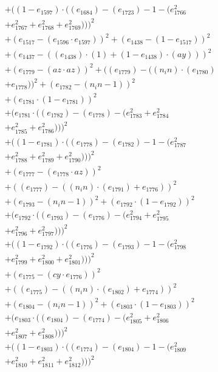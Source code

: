 \documentclass[10pt, a4paper]{article}
\begin{document}
\begin{align*}
& + ((1 - e_{1597})  \cdot  ((e_{1684}) - (e_{1723}) - 1 - (e_{1766}^{2} \\
& + e_{1767}^{2} + e_{1768}^{2} + e_{1769}^{2})))^{2} \\
& + (e_{1517} - (e_{1596}  \cdot  e_{1597}))^{2} + (e_{1438} - (1 - e_{1517}))^{2} \\
& + (e_{1437} - ((e_{1438})  \cdot  (1) + (1 - e_{1438})  \cdot  (ay)))^{2} \\
& + (e_{1779} - (az  \cdot  az))^{2} + ((e_{1779}) - ((n_in)  \cdot  (e_{1780}) \\
& + e_{1778}))^{2} + (e_{1782} - (n_in - 1))^{2} \\
& + (e_{1781}  \cdot  (1 - e_{1781}))^{2} \\
& + (e_{1781}  \cdot  ((e_{1782}) - (e_{1778}) - (e_{1783}^{2} + e_{1784}^{2} \\
& + e_{1785}^{2} + e_{1786}^{2})))^{2} \\
& + ((1 - e_{1781})  \cdot  ((e_{1778}) - (e_{1782}) - 1 - (e_{1787}^{2} \\
& + e_{1788}^{2} + e_{1789}^{2} + e_{1790}^{2})))^{2} \\
& + (e_{1777} - (e_{1778}  \cdot  az))^{2} \\
& + ((e_{1777}) - ((n_in)  \cdot  (e_{1791}) + e_{1776}))^{2} \\
& + (e_{1793} - (n_in - 1))^{2} + (e_{1792}  \cdot  (1 - e_{1792}))^{2} \\
& + (e_{1792}  \cdot  ((e_{1793}) - (e_{1776}) - (e_{1794}^{2} + e_{1795}^{2} \\
& + e_{1796}^{2} + e_{1797}^{2})))^{2} \\
& + ((1 - e_{1792})  \cdot  ((e_{1776}) - (e_{1793}) - 1 - (e_{1798}^{2} \\
& + e_{1799}^{2} + e_{1800}^{2} + e_{1801}^{2})))^{2} \\
& + (e_{1775} - (cy  \cdot  e_{1776}))^{2} \\
& + ((e_{1775}) - ((n_in)  \cdot  (e_{1802}) + e_{1774}))^{2} \\
& + (e_{1804} - (n_in - 1))^{2} + (e_{1803}  \cdot  (1 - e_{1803}))^{2} \\
& + (e_{1803}  \cdot  ((e_{1804}) - (e_{1774}) - (e_{1805}^{2} + e_{1806}^{2} \\
& + e_{1807}^{2} + e_{1808}^{2})))^{2} \\
& + ((1 - e_{1803})  \cdot  ((e_{1774}) - (e_{1804}) - 1 - (e_{1809}^{2} \\
& + e_{1810}^{2} + e_{1811}^{2} + e_{1812}^{2})))^{2} \\

\end{align*}
\end{document}
